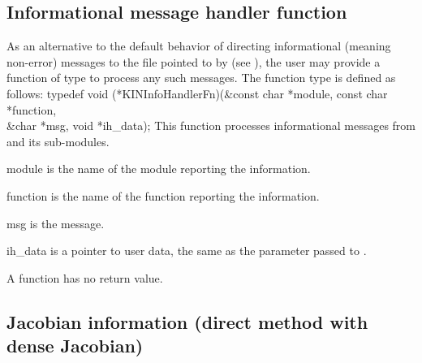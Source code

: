 \subsection{Informational message handler function}
\label{ss:ihFn}
As an alternative to the default behavior of directing informational (meaning non-error) messages 
to the file pointed to by  (see ), the user may
provide a function of type  to process any such messages.
The function type  is defined as follows:
{
  typedef void (*KINInfoHandlerFn)(&const char *module, const char *function, \\ 
                                   &char *msg, void *ih\_data); 
}
{
  This function processes informational messages from {\kinsol} and 
  its sub-modules.
}
{
  \begin{args}[function]
  \item[module]
    is the name of the {\kinsol} module reporting the information.
  \item[function]
    is the name of the function reporting the information.
  \item[msg]
    is the message.
  \item[ih\_data]
    is a pointer to user data, the same as the 
    parameter passed to .   
  \end{args}
}
{
  A  function has no return value.
}
{}

\subsection{Jacobian information (direct method with dense Jacobian)}
\label{ss:djacFn}

